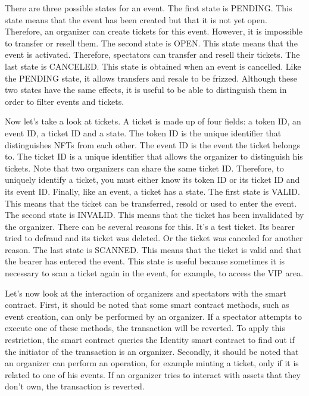 \documentclass[a4paper,11pt,oneside]{report}
\begin{document}
There are three possible states for an event. The first state is PENDING. This state means that the event has been created but that it is not yet open. Therefore, an organizer can create tickets for this event. However, it is impossible to transfer or resell them. The second state is OPEN. This state means that the event is activated. Therefore, spectators can transfer and resell their tickets. The last state is CANCELED. This state is obtained when an event is cancelled. Like the PENDING state, it allows transfers and resale to be frizzed. Although these two states have the same effects, it is useful to be able to distinguish them in order to filter events and tickets.

Now let's take a look at tickets. A ticket is made up of four fields: a token ID, an event ID, a ticket ID and a state. The token ID is the unique identifier that distinguishes NFTs from each other. The event ID is the event the ticket belongs to. The ticket ID is a unique identifier that allows the organizer to distinguish his tickets. Note that two organizers can share the same ticket ID. Therefore, to uniquely identify a ticket, you must either know its token ID or its ticket ID and its event ID. Finally, like an event, a ticket has a state. The first state is VALID. This means that the ticket can be transferred, resold or used to enter the event. The second state is INVALID. This means that the ticket has been invalidated by the organizer. There can be several reasons for this. It's a test ticket. Its bearer tried to defraud and its ticket was deleted. Or the ticket was canceled for another reason. The last state is SCANNED. This means that the ticket is valid and that the bearer has entered the event. This state is useful because sometimes it is necessary to scan a ticket again in the event, for example, to access the VIP area.

Let's now look at the interaction of organizers and spectators with the smart contract. First, it should be noted that some smart contract methods, such as event creation, can only be performed by an organizer. If a spectator attempts to execute one of these methods, the transaction will be reverted. To apply this restriction, the smart contract queries the Identity smart contract to find out if the initiator of the transaction is an organizer. Secondly, it should be noted that an organizer can perform an operation, for example minting a ticket, only if it is related to one of his events. If an organizer tries to interact with assets that they don't own, the transaction is reverted.
\end{document}
